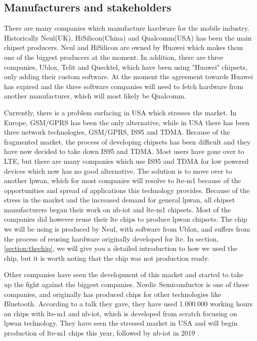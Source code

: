 \documentclass[USenglish]{ifimaster}  %
\begin{document}
\subsection{Manufacturers and stakeholders} \label{ssection:manufacture}
There are many companies which manufacture hardware for the mobile industry. Historically Neul(UK), HiSilicon(China) and Qualcomm(USA) has been the main chipset producers. Neul and HiSilicon are owned by Huawei which makes them one of the biggest producers at the moment. In addition, there are three companies, Ublox, Telit and Quecktel, which have been using "Huawei" chipsets, only adding their custom software. At the moment the agreement towards Huawei has expired and the three software companies will need to fetch hardware from another manufacturer, which will most likely be Qualcomm.

Currently, there is a problem surfacing in USA which stresses the market. In Europe, GSM/GPRS has been the only alternative, while in USA there has been three network technologies, GSM/GPRS, IS95 and TDMA. Because of the fragmented market, the process of developing chipsets has been difficult and they have now decided to take down IS95 and TDMA. Most users have gone over to LTE, but there are many companies which use IS95 and TDMA for low powered devices which now has no good alternative. The solution is to move over to another \acrshort{lpwan}, which for most companies will resolve to \acrshort{lte-m1} because of the opportunities and spread of applications this technology provides.
Because of the stress in the market and the increased demand for general \acrshort{lpwan}, all chipset manufacturers began their work on \acrshort{nb-iot} and \acrshort{lte-m1} chipsets. Most of the companies did however reuse their \acrshort{lte} chips to produce \acrshort{lpwan} chipsets. The chip we will be using is produced by Neul, with software from Ublox, and suffers from the process of reusing hardware originally developed for \acrshort{lte}. In section, \vref{section:thechip}, we will give you a detailed introduction to how we used the chip, but it is worth noting that the chip was not production ready.

Other companies have seen the development of this market and started to take up the fight against the biggest companies. Nordic Semiconductor is one of these companies, and originally has produced chips for other technologies like Bluetooth. According to a talk they gave, they have used 1.000.000 working hours on chips with \acrshort{lte-m1} and \acrshort{nb-iot}, which is developed from scratch focusing on \acrshort{lpwan} technology. They have seen the stressed market in USA and will begin production of \acrshort{lte-m1} chips this year, followed by \acrshort{nb-iot} in 2019 \cite{person:ola}.
\end{document}

